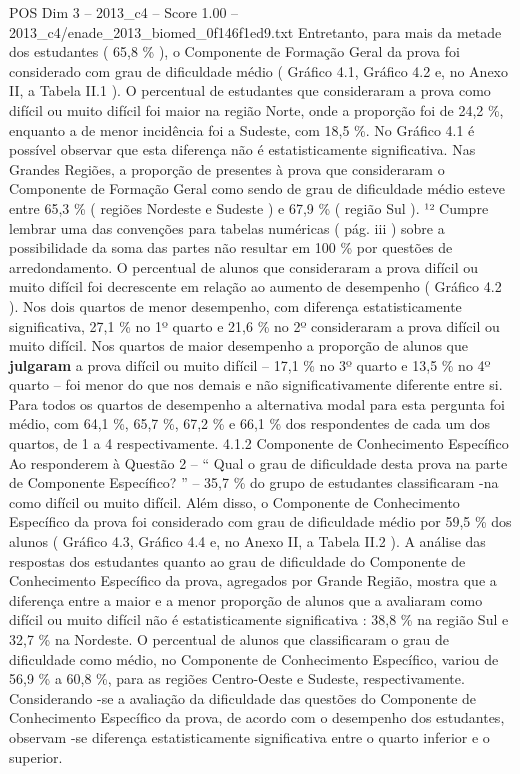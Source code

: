 \begin{textsample}{POS Dim 3 – 2013\_c4 – Score 1.00 – 2013\_c4/enade\_2013\_biomed\_0f146f1ed9.txt}
Entretanto, para mais da metade dos estudantes ( 65,8 \% ), o Componente de Formação Geral da prova foi considerado com grau de dificuldade médio ( Gráfico 4.1, Gráfico 4.2 e, no Anexo II, a Tabela II.1 ).
O percentual de estudantes que consideraram a prova como difícil ou muito difícil foi maior na região Norte, onde a proporção foi de 24,2 \%, enquanto a de menor incidência foi a Sudeste, com 18,5 \%.
No Gráfico 4.1 é possível observar que esta diferença não é estatisticamente significativa.
Nas Grandes Regiões, a proporção de presentes à prova que consideraram o Componente de Formação Geral como sendo de grau de dificuldade médio esteve entre 65,3 \% ( regiões Nordeste e Sudeste ) e 67,9 \% ( região Sul ). ¹² Cumpre lembrar uma das convenções para tabelas numéricas ( pág. iii ) sobre a possibilidade da soma das partes não resultar em 100 \% por questões de arredondamento.
O percentual de alunos que consideraram a prova difícil ou muito difícil foi decrescente em relação ao aumento de desempenho ( Gráfico 4.2 ).
Nos dois quartos de menor desempenho, com diferença estatisticamente significativa, 27,1 \% no 1º quarto e 21,6 \% no 2º consideraram a prova difícil ou muito difícil.
Nos quartos de maior desempenho a proporção de alunos que \textbf{julgaram} a prova difícil ou muito difícil – 17,1 \% no 3º quarto e 13,5 \% no 4º quarto – foi menor do que nos demais e não significativamente diferente entre si.
Para todos os quartos de desempenho a alternativa modal para esta pergunta foi médio, com 64,1 \%, 65,7 \%, 67,2 \% e 66,1 \% dos respondentes de cada um dos quartos, de 1 a 4 respectivamente. 4.1.2 Componente de Conhecimento Específico Ao responderem à Questão 2 – “ Qual o grau de dificuldade desta prova na parte de Componente Específico? ” – 35,7 \% do grupo de estudantes classificaram -na como difícil ou muito difícil.
Além disso, o Componente de Conhecimento Específico da prova foi considerado com grau de dificuldade médio por 59,5 \% dos alunos ( Gráfico 4.3, Gráfico 4.4 e, no Anexo II, a Tabela II.2 ).
A análise das respostas dos estudantes quanto ao grau de dificuldade do Componente de Conhecimento Específico da prova, agregados por Grande Região, mostra que a diferença entre a maior e a menor proporção de alunos que a avaliaram como difícil ou muito difícil não é estatisticamente significativa : 38,8 \% na região Sul e 32,7 \% na Nordeste.
O percentual de alunos que classificaram o grau de dificuldade como médio, no Componente de Conhecimento Específico, variou de 56,9 \% a 60,8 \%, para as regiões Centro-Oeste e Sudeste, respectivamente.
Considerando -se a avaliação da dificuldade das questões do Componente de Conhecimento Específico da prova, de acordo com o desempenho dos estudantes, observam -se diferença estatisticamente significativa entre o quarto inferior e o superior.

\end{textsample}
